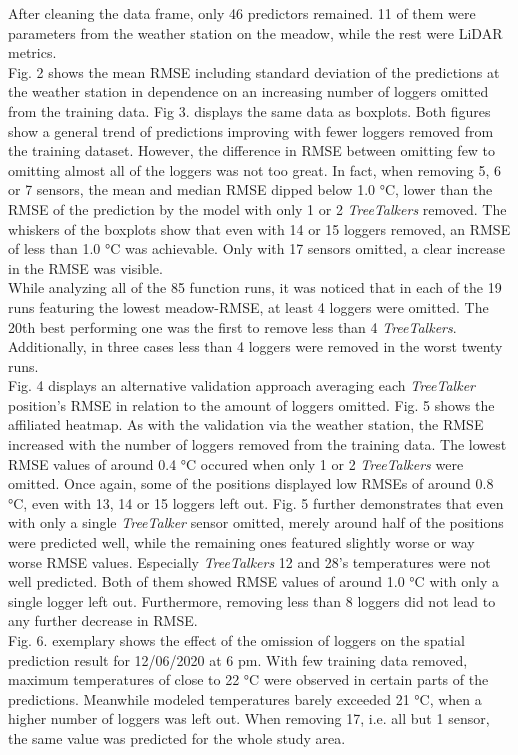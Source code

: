 \documentclass[5p]{elsarticle} %
\begin{document}
After cleaning the data frame, only 46 predictors remained. 11 of them were parameters from the weather station on the meadow, while the rest were LiDAR metrics. \\
Fig. 2 shows the mean RMSE including standard deviation of the predictions at the weather station in dependence on an increasing number of loggers omitted from the training data. Fig 3. displays the same data as boxplots. Both figures show a general trend of predictions improving with fewer loggers removed from the training dataset. However, the difference in RMSE between omitting few to omitting almost all of the loggers was not too great. In fact, when removing 5, 6 or 7 sensors, the mean and median RMSE dipped below 1.0 °C, lower than the RMSE of the prediction by the model with only 1 or 2 \emph{TreeTalkers} removed. The whiskers of the boxplots show that even with 14 or 15 loggers removed, an RMSE of less than 1.0 °C was achievable. Only with 17 sensors omitted, a clear increase in the RMSE was visible. \\
While analyzing all of the 85 function runs, it was noticed that in each of the 19 runs featuring the lowest meadow-RMSE, at least 4 loggers were omitted. The 20th best performing one was the first to remove less than 4 \emph{TreeTalkers}. Additionally, in three cases less than 4 loggers were removed in the worst twenty runs.\\
Fig. 4 displays an alternative validation approach averaging each \emph{TreeTalker} position’s RMSE in relation to the amount of loggers omitted. Fig. 5 shows the affiliated heatmap. As with the validation via the weather station, the RMSE increased with the number of loggers removed from the training data. The lowest RMSE values of around 0.4 °C occured when only 1 or 2 \emph{TreeTalkers} were omitted. Once again, some of the positions displayed low RMSEs of around 0.8 °C, even with 13, 14 or 15 loggers left out. Fig. 5 further demonstrates that even with only a single \emph{TreeTalker} sensor omitted, merely around half of the positions were predicted well, while the remaining ones featured slightly worse or way worse RMSE values. Especially \emph{TreeTalkers} 12 and 28’s temperatures were not well predicted. Both of them showed RMSE values of around 1.0 °C with only a single logger left out. Furthermore, removing less than 8 loggers did not lead to any further decrease in RMSE.\\ 
Fig. 6. exemplary shows the effect of the omission of loggers on the spatial prediction result for 12/06/2020 at 6 pm. With few training data removed, maximum temperatures of close to 22 °C were observed in certain parts of the predictions. Meanwhile modeled temperatures barely exceeded 21 °C, when a higher number of loggers was left out. When removing 17, i.e. all but 1 sensor, the same value was predicted for the whole study area.
\end{document}
